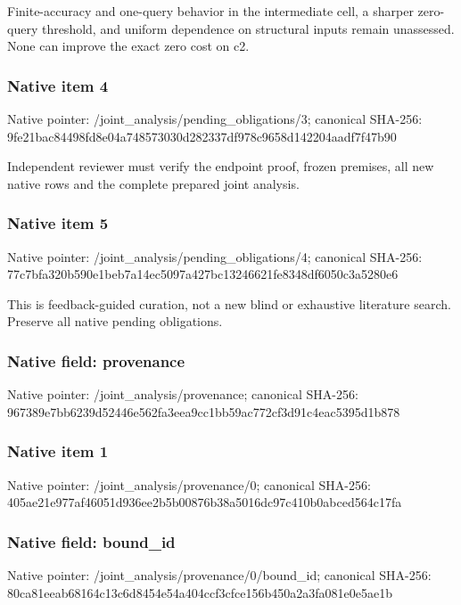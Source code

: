 \documentclass[10pt,a4paper]{article}
\begin{document}
\begingroup\raggedright\sloppy Finite-accuracy and one-query behavior in the intermediate cell,\allowbreak{} a sharper zero-query threshold,\allowbreak{} and uniform dependence on structural inputs remain unassessed. None can improve the exact zero cost on c2.\par\endgroup

\subsubsection{Native item 4}
Native pointer: /joint\_\allowbreak{}analysis/pending\_\allowbreak{}obligations/3; canonical SHA-256: 9fe21bac84498fd8e04a748573030d282337df978c9658d142204aadf7f47b90

\begingroup\raggedright\sloppy Independent reviewer must verify the endpoint proof,\allowbreak{} frozen premises,\allowbreak{} all new native rows and the complete prepared joint analysis.\par\endgroup

\subsubsection{Native item 5}
Native pointer: /joint\_\allowbreak{}analysis/pending\_\allowbreak{}obligations/4; canonical SHA-256: 77c7bfa320b590e1beb7a14ec5097a427bc13246621fe8348df6050c3a5280e6

\begingroup\raggedright\sloppy This is feedback-guided curation,\allowbreak{} not a new blind or exhaustive literature search. Preserve all native pending obligations.\par\endgroup

\subsubsection{Native field: provenance}
Native pointer: /joint\_\allowbreak{}analysis/provenance; canonical SHA-256: 967389e7bb6239d52446e562fa3eea9cc1bb59ac772cf3d91c4eac5395d1b878

\subsubsection{Native item 1}
Native pointer: /joint\_\allowbreak{}analysis/provenance/0; canonical SHA-256: 405ae21e977af46051d936ee2b5b00876b38a5016dc97c410b0abced564c17fa

\subsubsection{Native field: bound\_\allowbreak{}id}
Native pointer: /joint\_\allowbreak{}analysis/provenance/0/bound\_\allowbreak{}id; canonical SHA-256: 80ca81eeab68164c13c6d8454e54a404ccf3cfce156b450a2a3fa081e0e5ae1b
\end{document}

